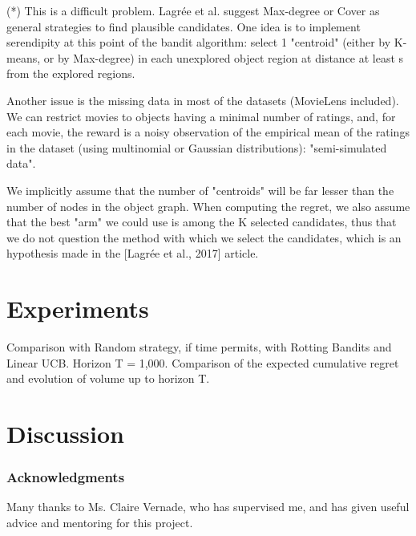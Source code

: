 \documentclass{article}
\begin{document}
(*) This is a difficult problem. Lagrée et al. suggest Max-degree or Cover as general strategies to find plausible candidates. One idea is to implement serendipity at this point of the bandit algorithm: select 1 "centroid" (either by K-means, or by Max-degree) in each unexplored object region at distance at least s from the explored regions.

Another issue is the missing data in most of the datasets (MovieLens included). We can restrict movies to objects having a minimal number of ratings, and, for each movie, the reward is a noisy observation of the empirical mean of the ratings in the dataset (using multinomial or Gaussian distributions): "semi-simulated data".

We implicitly assume that the number of "centroids" will be far lesser than the number of nodes in the object graph. When computing the regret, we also assume that the best "arm" we could use is among the K selected candidates, thus that we do not question the method with which we select the candidates, which is an hypothesis made in the [Lagrée et al., 2017] article.

\section{Experiments}

Comparison with Random strategy, if time permits, with Rotting Bandits and Linear UCB. Horizon T = 1,000. Comparison of the expected cumulative regret and evolution of volume up to horizon T.


\section{Discussion}


\subsubsection*{Acknowledgments}

Many thanks to Ms. Claire Vernade, who has supervised me, and has given useful advice and mentoring for this project.



\end{document}
